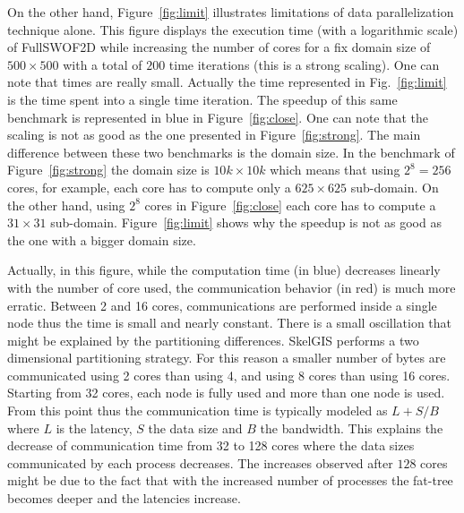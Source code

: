 On the other hand, Figure~\ref{fig:limit} illustrates limitations of data parallelization technique alone. This figure displays the execution time (with a logarithmic scale) of FullSWOF2D while increasing the number of cores for a fix domain size of $500 \times 500$ with a total of $200$ time iterations (\ie this is a strong scaling). One can note that times are really small. Actually the time represented in Fig.~\ref{fig:limit} is the time spent into a single time iteration. The speedup of this same benchmark is represented in blue in Figure~\ref{fig:close}. One can note that the scaling is not as good as the one presented in Figure~\ref{fig:strong}. 
The main difference between these two benchmarks is the domain size. In the benchmark of Figure~\ref{fig:strong} the domain size is $10k \times 10k$ which means that using $2^8 = 256$ cores, for example, each core has to compute only a $625 \times 625$ sub-domain. On the other hand, using $2^8$ cores in Figure~\ref{fig:close} each core has to compute a $31 \times 31$ sub-domain. Figure~\ref{fig:limit} shows why the speedup is not as good as the one with a bigger domain size.  

Actually, in this figure, while the computation time (in blue) decreases linearly with the number of core used, the communication behavior (in red) is much more erratic. Between 2 and 16 cores, communications are performed inside a single node thus the time is small and nearly constant. There is a small oscillation that might be explained by the partitioning differences. SkelGIS performs a two dimensional partitioning strategy. For this reason a smaller number of bytes are communicated using 2 cores than using 4, and using 8 cores than using 16 cores. Starting from 32 cores, each node is fully used and more than one node is used. From this point thus the communication time is typically modeled as $L+S/B$ where $L$ is the latency, $S$ the data size and $B$ the bandwidth. This explains the decrease of communication time from 32 to 128 cores where the data sizes communicated by each process decreases. The increases observed after $128$ cores might be due to the fact that with the increased number of processes the fat-tree becomes deeper and the latencies increase.

